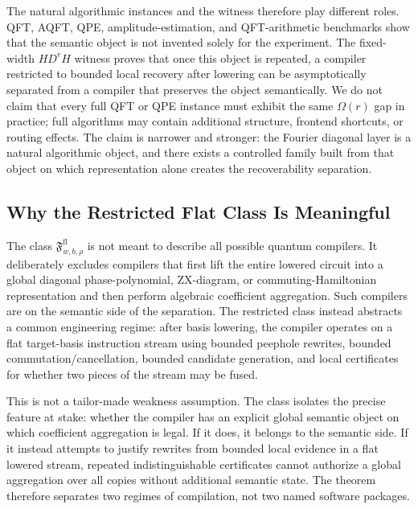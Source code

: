 \documentclass[11pt]{article}
\begin{document}
The natural algorithmic instances and the witness therefore play different
roles. QFT, AQFT, QPE, amplitude-estimation, and QFT-arithmetic benchmarks show
that the semantic object is not invented solely for the experiment. The
fixed-width $H D^r H$ witness proves that once this object is repeated, a
compiler restricted to bounded local recovery after lowering can be
asymptotically separated from a compiler that preserves the object semantically.
We do not claim that every full QFT or QPE instance must exhibit the same
$\Omega(r)$ gap in practice; full algorithms may contain additional structure,
frontend shortcuts, or routing effects. The claim is narrower and stronger:
the Fourier diagonal layer is a natural algorithmic object, and there exists a
controlled family built from that object on which representation alone creates
the recoverability separation.

\subsection{Why the Restricted Flat Class Is Meaningful}

The class $\mathfrak{F}^{\mathrm{fl}}_{w,b,\rho}$ is not meant to describe all
possible quantum compilers. It deliberately excludes compilers that first lift
the entire lowered circuit into a global diagonal phase-polynomial,
ZX-diagram, or commuting-Hamiltonian representation and then perform algebraic
coefficient aggregation. Such compilers are on the semantic side of the
separation. The restricted class instead abstracts a common engineering regime:
after basis lowering, the compiler operates on a flat target-basis instruction
stream using bounded peephole rewrites, bounded commutation/cancellation,
bounded candidate generation, and local certificates for whether two pieces of
the stream may be fused.

This is not a tailor-made weakness assumption. The class isolates the precise
feature at stake: whether the compiler has an explicit global semantic object
on which coefficient aggregation is legal. If it does, it belongs to the
semantic side. If it instead attempts to justify rewrites from bounded local
evidence in a flat lowered stream, repeated indistinguishable certificates
cannot authorize a global aggregation over all copies without additional
semantic state. The theorem therefore separates two regimes of compilation,
not two named software packages.
\end{document}
